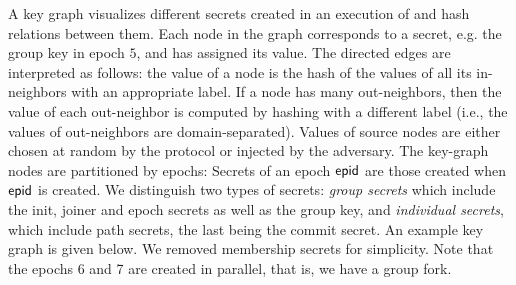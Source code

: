 A key graph visualizes different secrets created in an execution of \saik and hash relations between them. Each node in the graph corresponds to a secret, e.g. the group key in epoch $5$, and has assigned its value. The directed edges are interpreted as follows: the value of a node is the hash of the values of all its in-neighbors with an appropriate label. If a node has many out-neighbors, then the value of each out-neighbor is computed by hashing with a different label (i.e., the values of out-neighbors are domain-separated).
Values of source nodes are either chosen at random by the protocol or injected by the adversary.
The key-graph nodes are partitioned by epochs: Secrets of an epoch ${\normalfont\textsf{epid}}$ are those created when ${\normalfont\textsf{epid}}$ is created.
We distinguish two types of secrets: \emph{group secrets} which include the init, joiner and epoch secrets as well as the group key, and \emph{individual secrets}, which include path secrets, the last being the commit secret.
An example key graph is given below. We removed membership secrets for simplicity. Note that the epochs 6 and 7 are created in parallel, that is, we have a group fork.

